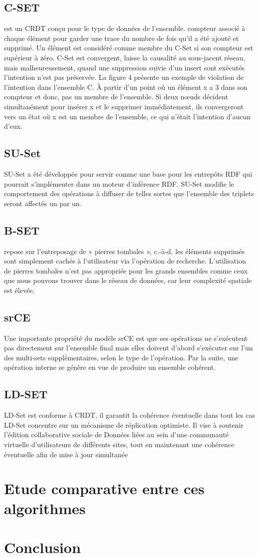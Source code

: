 \documentclass[12pt]{report}
\begin{document}
\subsection{C-SET \cite{C-SET}}
est un CRDT conçu pour le type de données de l’ensemble.
compteur associé à chaque élément pour garder une trace du nombre de fois qu’il a été ajouté et supprimé. Un élément est considéré comme membre du C-Set si son compteur
est supérieur à zéro. C-Set est convergent, laisse la causalité au sous-jacent réseau, mais malheureusement, quand une suppression suivie d’un insert sont exécutés
l’intention n’est pas préservée. La figure 4 présente un exemple de violation de l’intention dans l’ensemble C. À partir d’un point où un élément x a 3 dans son compteur et donc, pas un membre de l’ensemble. Si deux nœuds décident simultanément pour insérer x et le supprimer immédiatement, ils convergeront vers un état où x est un membre de l’ensemble, ce qui n’était l’intention d’aucun d’eux.
\subsection{SU-Set}
SU-Set a été développée pour servir comme une base pour les entrepôts RDF qui 
pourrait s’implémenter dans un moteur d’inférence RDF. SU-Set modifie le comportement des 
opérations à diffuser de telles sortes que l’ensemble des triplets seront affectés un par un.
\subsection{B-SET \cite{B-SET}} repose sur l’entreposage de « pierres tombales », c.-à-d. les éléments supprimés sont simplement cachés à l’utilisateur via l’opération de recherche. L’utilisation de pierres tombales n’est pas appropriée pour les grands ensembles comme ceux que nous pouvons trouver dans le réseau de données, car leur complexité spatiale est élevée.
\subsection{srCE}
Une importante propriété du modèle srCE est que ses opérations ne s’exécutent pas 
directement sur l’ensemble final mais elles doivent d’abord s’exécuter sur l’un des multi-sets 
supplémentaires, selon le type de l’opération. Par la suite, une opération interne se génère en vue 
de produire un ensemble cohérent.
\subsection{LD-SET}
LD-Set est conforme à CRDT, il garantit la cohérence éventuelle dans tout les cas LD-Set concentre sur un mécanisme de réplication optimiste. Il vise à
soutenir l’édition collaborative sociale de Données liées au sein d’une communauté virtuelle d’utilisateurs de différents sites, tout en maintenant une cohérence éventuelle afin de mise à jour simultanée
\section{Etude comparative entre ces algorithmes}
\section*{Conclusion}
 

 

\end{document}
